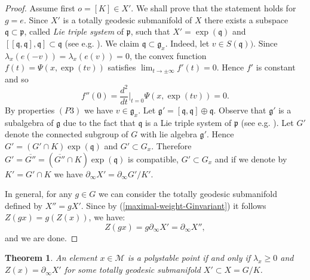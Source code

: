 \documentclass[leqno,11pt, a4]{amsart}
\newtheorem{teo}[equation]{Theorem}
\theoremstyle{named}
\begin{document}
\begin{proof}
Assume first $o=[K]\in X'$. We shall prove that the statement holds for $g=e$. Since $X'$ is a totally geodesic submanifold of $X$ there exists a subspace ${\mathfrak{q}} \subset {\mathfrak{p}}${, called  \emph{Lie triple system} of ${\mathfrak{p}}$, } such that $X'=\exp({\mathfrak{q}})$ and $[[{\mathfrak{q}},{\mathfrak{q}} ],{\mathfrak{q}}]\subset {\mathfrak{q}}$ (see e.g. \cite{helgason}).
We claim ${\mathfrak{q}}\subset {\mathfrak{g}}_x$. Indeed, let $v\in S({\mathfrak{q}}))$. Since ${\lambda}_x (e(-v))={\lambda}_x(e(v))=0$, the convex function $f(t)=\Psi(x,\exp(tv))$ satisfies $\lim_{t\to \pm \infty} f'(t)=0$. Hence $f'$ is constant and so
\[
f''(0)=\frac{d^2}{dt} \bigg \vert_{t=0} \Psi(x,\exp(tv))=0.
\]
By properties $(P3)$ we have $v\in {\mathfrak{g}}_x$.
Let
${\mathfrak{g}}'=[{\mathfrak{q}},{\mathfrak{q}}]\oplus {\mathfrak{q}}$. Observe that  ${\mathfrak{g}}'$ is a subalgebra of ${\mathfrak{g}}$  due to the fact that ${\mathfrak{q}}$ is a Lie triple system of ${\mathfrak{p}}$ (see e.g. \cite{helgason}{)}. Let $G'$ denote the connected subgroup of $G$ with lie algebra ${\mathfrak{g}}'$. Hence $G'=(G'\cap K)\exp ({\mathfrak{q}})$ and $G'\subset G_x$. Therefore $G'=\overline{G''}=(\overline{G''} \cap K)\exp({\mathfrak{q}})$ is compatible, $G'\subset G_x$ and if we denote by $K'=G'\cap K$ we have $\partial_\infty X'=\partial_\infty G'/K'$.

In general, for any $g\in G$ we can consider the totally geodesic submanifold defined by $X''=gX'$. Since by (\ref{maximal-weight-Ginvariant}) it follows $Z(gx)=g(Z(x))$, we have:
$$
Z(g x)=g\partial_\infty X'=\partial_\infty X'',
$$
and we are done.

\end{proof}
\begin{teo}\label{polystable-condition}
An element $x\in {\mathscr{M}}$ is a polystable point if and only if ${\lambda}_x \geq 0$ and $Z(x) = \partial_\infty X'$ for some totally geodesic submanifold $X'\subset X=G/K$.
\end{teo}
\end{document}
